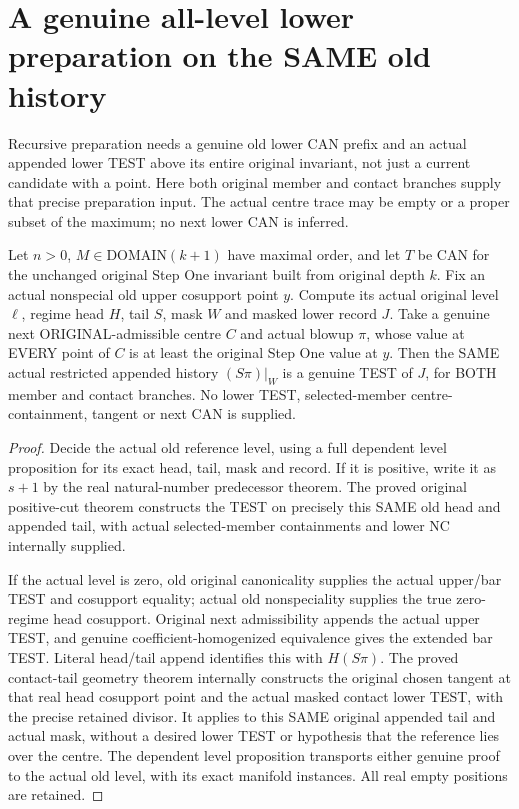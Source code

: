 \section{A genuine all-level lower preparation on the SAME old history}

Recursive preparation needs a genuine old lower CAN prefix and an actual
appended lower TEST above its entire original invariant, not just a current
candidate with a point. Here both original member and contact branches supply
that precise preparation input. The actual centre trace may be empty or a
proper subset of the maximum; no next lower CAN is inferred.

\begin{theorem}
\label{hir:original-stepone-cut-all-level-frozen-lower-test}
\leanok
Let $n>0$, $M\in\mathrm{DOMAIN}(k+1)$ have maximal order, and let $T$ be
CAN for the unchanged original Step One invariant built from original depth
$k$. Fix an actual nonspecial old upper cosupport point $y$. Compute its
actual original level $\ell$, regime head $H$, tail $S$, mask $W$ and masked
lower record $J$. Take a genuine next ORIGINAL-admissible centre $C$ and
actual blowup $\pi$, whose value at EVERY point of $C$ is at least the
original Step One value at $y$. Then the SAME actual restricted appended
history $(S\pi)|_W$ is a genuine TEST of $J$, for BOTH member and contact
branches. No lower TEST, selected-member centre-containment, tangent or next CAN is supplied.
\end{theorem}
\begin{proof}
Decide the actual old reference level, using a full dependent level
proposition for its exact head, tail, mask and record. If it is positive,
write it as $s+1$ by the real natural-number predecessor theorem. The proved
original positive-cut theorem constructs the TEST on precisely this SAME
old head and appended tail, with actual selected-member containments and
lower NC internally supplied.

If the actual level is zero, old original canonicality supplies the actual
upper/bar TEST and cosupport equality; actual old nonspeciality supplies the
true zero-regime head cosupport. Original next admissibility appends the
actual upper TEST, and genuine coefficient-homogenized equivalence gives the
extended bar TEST. Literal head/tail append identifies this with $H(S\pi)$.
The proved contact-tail geometry theorem internally constructs the original
chosen tangent at that real head cosupport point and the actual masked
contact lower TEST, with the precise retained divisor. It applies to this
SAME original appended tail and actual mask, without a desired lower TEST or
hypothesis that the reference lies over the centre. The dependent level
proposition transports either genuine proof to the actual old level, with
its exact manifold instances. All real empty positions are retained.
\end{proof}

